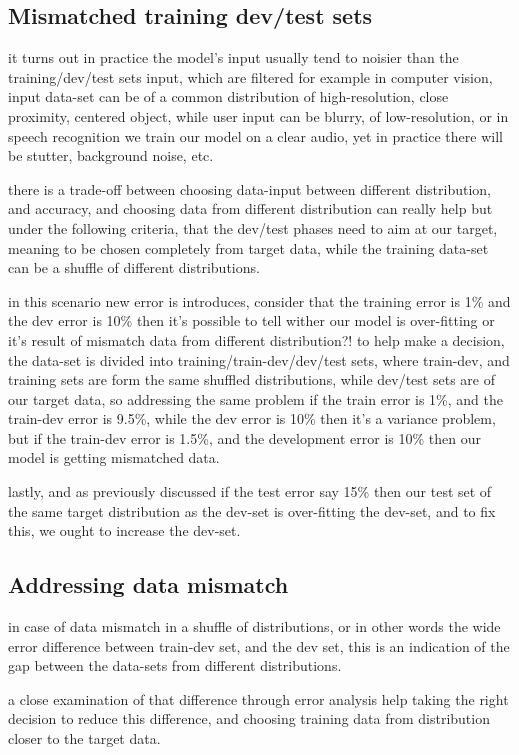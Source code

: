 \documentclass[4apaper,12pt]{book}
\begin{document}
\begin{description}
  \section{Mismatched training dev/test sets}
  \begin{description}
  \item it turns out in practice the model's input usually tend to noisier than the training/dev/test sets input, which are filtered for example in computer vision, input data-set can be of a common distribution of high-resolution, close proximity, centered object, while user input can be blurry, of low-resolution, or in speech recognition we train our model on a clear audio, yet in practice there will be stutter, background noise, etc.
  \item there is a trade-off between choosing data-input between different distribution, and accuracy, and choosing data from different distribution can really help but under the following criteria, that the dev/test phases need to aim at our target, meaning to be chosen completely from target data, while the training data-set can be a shuffle of different distributions.
  \item in this scenario new error is introduces, consider that the training error is 1\% and the dev error is 10\% then it's possible to tell wither our model is over-fitting or it's result of mismatch data from different distribution?! to help make a decision, the data-set is divided into training/train-dev/dev/test sets, where train-dev, and training sets are form the same shuffled distributions, while dev/test sets are of our target data, so addressing the same problem if the train error is 1\%, and the train-dev error is 9.5\%, while the dev error is 10\% then it's a variance problem, but if the train-dev error is 1.5\%, and the development error is 10\% then our model is getting mismatched data.
  \item lastly, and as previously discussed if the test error say 15\% then our test set of the same target distribution as the dev-set is over-fitting the dev-set, and to fix this, we ought to increase the dev-set.
    \subsection{Addressing data mismatch}
  \item in case of data mismatch in a shuffle of distributions, or in other words the wide error difference between train-dev set, and the dev set, this is an indication of the gap between the data-sets from different distributions.
  \item a close examination of that difference through error analysis help taking the right decision to reduce this difference, and choosing training data from distribution closer to the target data.

\end{description}
\end{description}
\end{document}
